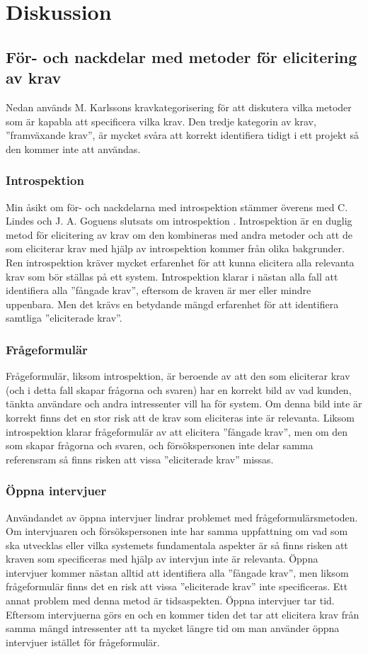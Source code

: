 \section{Diskussion}
\label{sec:discussion-jannering}

\subsection{För- och nackdelar med metoder för elicitering av krav}
Nedan används M. Karlssons kravkategorisering för att diskutera vilka metoder som är kapabla att specificera vilka krav. Den tredje kategorin av krav, ”framväxande krav”, är mycket svåra att korrekt identifiera tidigt i ett projekt så den kommer inte att användas.
\subsubsection{Introspektion}
Min åsikt om för- och nackdelarna med introspektion stämmer överens med C. Lindes och J. A. Goguens slutsats om introspektion \cite{goguen1993techniques}. Introspektion är en duglig metod för elicitering av krav om den kombineras med andra metoder och att de som eliciterar krav med hjälp av introspektion kommer från olika bakgrunder. Ren introspektion kräver mycket erfarenhet för att kunna elicitera alla relevanta krav som bör ställas på ett system. Introspektion klarar i nästan alla fall att identifiera alla ”fångade krav”, eftersom de kraven är mer eller mindre uppenbara. Men det krävs en betydande mängd erfarenhet för att identifiera samtliga ”eliciterade krav”.

\subsubsection{Frågeformulär}
Frågeformulär, liksom introspektion, är beroende av att den som eliciterar krav (och i detta fall skapar frågorna och svaren) har en korrekt bild av vad kunden, tänkta användare och andra intressenter vill ha för system. Om denna bild inte är korrekt finns det en stor risk att de krav som eliciteras inte är relevanta. Liksom introspektion klarar frågeformulär av att elicitera ”fångade krav”, men om den som skapar frågorna och svaren, och försökspersonen inte delar samma referensram så finns risken att vissa ”eliciterade krav” missas. 

\subsubsection{Öppna intervjuer}
Användandet av öppna intervjuer lindrar problemet med frågeformulärsmetoden. Om intervjuaren och försökspersonen inte har samma uppfattning om vad som ska utvecklas eller vilka systemets fundamentala aspekter är så finns risken att kraven som specificeras med hjälp av intervjun inte är relevanta. Öppna intervjuer kommer nästan alltid att identifiera alla ”fångade krav”, men liksom frågeformulär finns det en risk att vissa ”eliciterade krav” inte specificeras. Ett annat problem med denna metod är tidsaspekten. Öppna intervjuer tar tid. Eftersom intervjuerna görs en och en kommer tiden det tar att elicitera krav från samma mängd intressenter att ta mycket längre tid om man använder öppna intervjuer istället för frågeformulär.  

